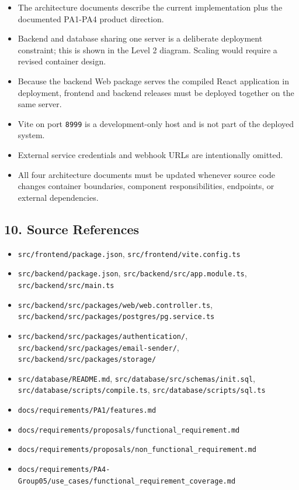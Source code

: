 \documentclass[12pt]{article}
\begin{document}
\begin{itemize}
\item The architecture documents describe the current implementation plus the documented PA1-PA4 product direction.
\item Backend and database sharing one server is a deliberate deployment constraint; this is shown in the Level 2 diagram. Scaling would require a revised container design.
\item Because the backend Web package serves the compiled React application in deployment, frontend and backend releases must be deployed together on the same server.
\item Vite on port \texttt{8999} is a development-only host and is not part of the deployed system.
\item External service credentials and webhook URLs are intentionally omitted.
\item All four architecture documents must be updated whenever source code changes container boundaries, component responsibilities, endpoints, or external dependencies.
\end{itemize}
\par\medskip

\hypertarget{sec:10-source-references}{}
\subsection*{10. Source References}
\par\medskip

\begin{itemize}
\item \texttt{src/frontend/package.json}, \texttt{src/frontend/vite.config.ts}
\item \texttt{src/backend/package.json}, \texttt{src/backend/src/app.module.ts}, \texttt{src/backend/src/main.ts}
\item \texttt{src/backend/src/packages/web/web.controller.ts}, \texttt{src/backend/src/packages/postgres/pg.service.ts}
\item \texttt{src/backend/src/packages/authentication/}, \texttt{src/backend/src/packages/email-sender/}, \texttt{src/backend/src/packages/storage/}
\item \texttt{src/database/README.md}, \texttt{src/database/src/schemas/init.sql}, \texttt{src/database/scripts/compile.ts}, \texttt{src/database/scripts/sql.ts}
\item \texttt{docs/requirements/PA1/features.md}
\item \texttt{docs/requirements/proposals/functional\_requirement.md}
\item \texttt{docs/requirements/proposals/non\_functional\_requirement.md}
\item \texttt{docs/requirements/PA4-Group05/use\_cases/functional\_requirement\_coverage.md}
\end{itemize}
\par\medskip
\end{document}

